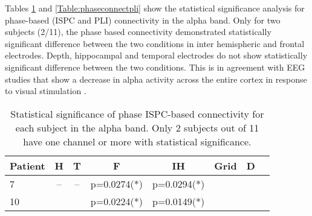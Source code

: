 \documentclass[11pt, onecolumn]{article}
\begin{document}
Tables \ref{Table:phaseconnectispc} and \ref{Table:phaseconnectpli} show the statistical significance analysis for phase-based (ISPC and PLI) connectivity in the alpha band.
Only for two subjects (2/11), the phase based connectivity demonstrated  statistically significant difference between the two conditions in inter hemispheric and frontal electrodes. Depth, hippocampal and temporal electrodes do not show statistically significant difference between the two conditions. This is in agreement with EEG studies that show a decrease in alpha activity across the entire cortex in response to visual stimulation \citep{barry2007eeg}.

\begin{table}
\centering
\begin{tabular}{l*{6}{c}r}
Patient & H & T & F & IH & Grid & D  \\
\hline
7 &  -- & -- &  p=0.0274(*) &   p=0.0294(*) &  &  \\ 
10 &  &  & p=0.0224(*) & p=0.0149(*) & & \\ 
\end{tabular}
\caption{\label{Table:phaseconnectispc} 
Statistical significance of phase ISPC-based connectivity for each subject in the alpha band. Only 2 subjects out of 11 have one channel or more with statistical significance.
}
\end{table}


\end{document}
